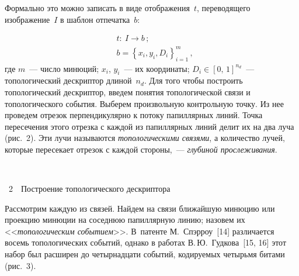 \begin{multicols}{2}
      
      Формально это можно записать в виде отображения~$t$, переводящего 
изображение~$I$ в шаблон отпечатка~$b$:

\noindent
      \begin{align*}
      &t:\ I\rightarrow b\,; %
      \\
      &b=\left\{ x_i,y_i,D_i\right\}^m_{i=1}\,, %
      \end{align*}
где $m$~--- число минюций; $x_i$, $y_i$~--- их координаты; $D_i\in [0,\,1]^{n_d}$~--- 
топологический дескриптор длиной~$n_d$. Для того чтобы построить топологический 
дескриптор, введем понятия топологической связи и топологического события. Выберем 
произвольную контрольную точку. Из нее проведем отрезок перпендикулярно к потоку 
папиллярных линий. Точка пересечения этого отрезка с каждой из папиллярных линий 
делит их на два луча (рис.~2). Эти лучи называются \textit{топологическими связями}, а 
количество лучей, которые пересекает отрезок с каждой стороны,~--- \textit{глубиной 
прослеживания}.

\begin{center} %
\vspace*{9pt}
\mbox{%
 \epsfxsize=76.744mm
}

\vspace*{9pt}
{{\figurename~2}\ \ \small{Построение топологического дескриптора}}
\end{center}

\vspace*{6pt}

\addtocounter{figure}{1}

      
      Рассмотрим каждую из связей. Найдем на связи ближайшую минюцию или 
проекцию минюции на соседнюю папиллярную линию; назовем их 
<<\textit{топологическим событием}>>. В~патенте М.~Спэрроу~[14] различается восемь 
топологических событий, однако в работах В.\,Ю.~Гудкова~[15, 16] этот набор был 
расширен до четырнадцати событий, кодируемых четырьмя битами (рис.~3).

\begin{figure*} %
 \vspace*{1pt}
 \begin{center}
 \mbox{%
 \epsfxsize=153.389mm
 }
 \end{center}
 \vspace*{-9pt}
\vspace*{6pt}
\end{figure*}
      


\end{multicols}
